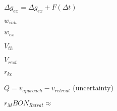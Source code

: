$\Delta g_{ex} = \Delta g_{ex} + F(\Delta t)$

$w_{inh}$

$w_{ex}$

$V_{th}$

$V_{rest}$

$r_{kc}$

$Q = v_{approach} - v_{retreat}$ (uncertainty)


$r_MBON_{Retrat} \approx $